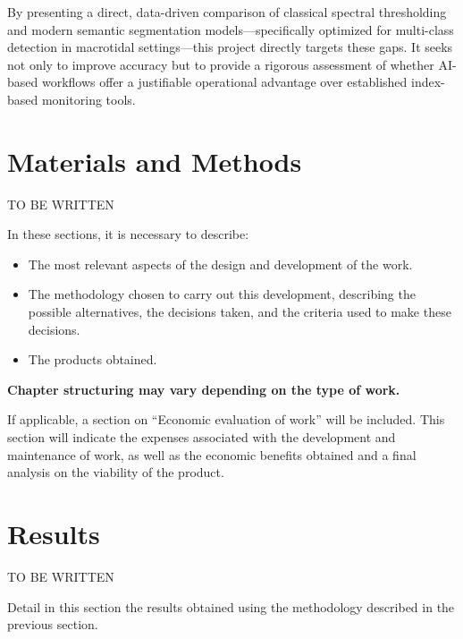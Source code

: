 ﻿\documentclass[ENG]{TFUOC}%
\begin{document}
By presenting a direct, data-driven comparison of classical spectral thresholding and modern semantic segmentation models—specifically optimized for multi-class detection in macrotidal settings—this project directly targets these gaps. It seeks not only to improve accuracy but to provide a rigorous assessment of whether AI-based workflows offer a justifiable operational advantage over established index-based monitoring tools.

\chapter{Materials and Methods}

TO BE WRITTEN

In these sections, it is necessary to describe:
\begin{itemize}
    \item The most relevant aspects of the design and development of the work.
    \item The methodology chosen to carry out this development, describing the possible alternatives, the decisions taken, and the criteria used to make these decisions.
    \item The products obtained.
\end{itemize}

 
\textbf{Chapter structuring may vary depending on the type of work.}  
 
If applicable, a section on “Economic evaluation of work” will be included. This section will indicate the expenses associated with the development and maintenance of work, as well as the economic benefits obtained and a final analysis on the viability of the product.



\chapter{Results}

TO BE WRITTEN

Detail in this section the results obtained using the methodology described in the previous section.



%
\end{document}
